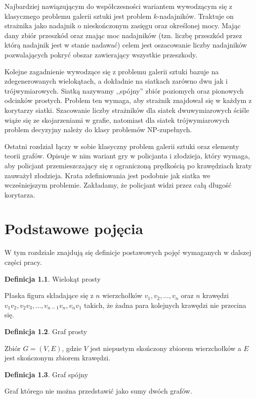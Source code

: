 \documentclass[brudnopis]{xmgr}
\theoremstyle{definition}
\newtheorem{Definicja}{Definicja}
\begin{document}
Najbardziej nawiązującym do współczesności wariantem wywodzącym się z klasycznego problemu galerii sztuki jest problem $k$-nadajników. Traktuje on strażnika jako nadajnik o nieskończonym zasięgu oraz określonej mocy. Mając dany zbiór przeszkód oraz znając moc nadajników (tzn. liczbę przeszkód przez którą nadajnik jest w stanie nadawać) celem jest oszacowanie liczby nadajników pozwalających pokryć obszar zawierający wszystkie przeszkody.

Kolejne zagadnienie wywodzące się z problemu galerii sztuki bazuje na zdegenerowanych wielokątach, a dokładnie na siatkach zarówno dwu jak i trójwymiarowych. Siatką nazywamy ,,spójny'' zbiór poziomych oraz pionowych odcinków prostych. Problem ten wymaga, aby strażnik znajdował się w każdym z korytarzy siatki. Szacowanie liczby strażników dla siatek dwuwymiarowych ściśle wiąże się ze skojarzeniami w grafie, natomiast dla siatek trójwymiarowych problem decyzyjny należy do klasy problemów NP-zupełnych.

Ostatni rozdział łączy w sobie klasyczny problem galerii sztuki oraz elementy teorii grafów. Opisuje w nim wariant gry w policjanta i złodzieja, który wymaga, aby policjant przemieszczający się z ograniczoną prędkością po krawędziach kraty zauważył złodzieja. Krata zdefiniowania jest podobnie jak siatka we wcześniejszym problemie. Zakładamy, że policjant widzi przez całą długość korytarza.


\chapter{Podstawowe pojęcia}
W tym rozdziale znajdują się definicje postawowych pojęć wymaganych w dalszej części pracy.

\begin{Definicja}{Wielokąt prosty}

  Płaska figura składające się z $n$ wierzchołków $v_1, v_2,\ldots, v_n$ oraz $n$ krawędzi $v_1v_2, v_2v_3, \ldots, v_{n-1}v_n,v_nv_1$ takich, że żadna para kolejnych krawędzi nie przecina się.
\end{Definicja}

\begin{Definicja}{Graf prosty}

  Zbiór $G = (V,E)$, gdzie $V$ jest niepustym skończony zbiorem wierzchołków a $E$ jest skończonym zbiorem krawędzi.
\end{Definicja}

\begin{Definicja}{Graf spójny}

  Graf którego nie można przedstawić jako sumy dwóch grafów.
\end{Definicja}
\end{document}
